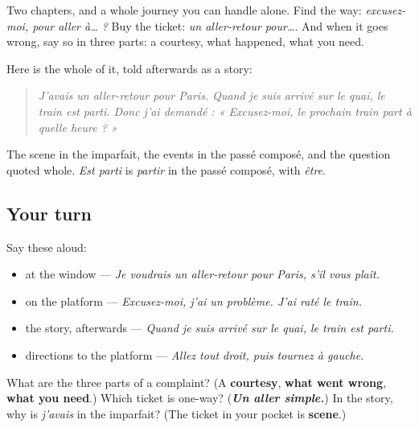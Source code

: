 \begin{grammarlens}[title={What you've built}]
Two chapters, and a whole journey you can handle alone. Find the way: \emph{excusez-moi, pour aller à… ?} Buy the ticket: \emph{un aller-retour pour…}. And when it goes wrong, say so in three parts: a courtesy, what happened, what you need.

Here is the whole of it, told afterwards as a story:

\begin{quote}
\emph{J'avais un aller-retour pour Paris. Quand je suis arrivé sur le quai, le train est parti. Donc j'ai demandé : « Excusez-moi, le prochain train part à quelle heure ? »}
\end{quote}

The scene in the imparfait, the events in the passé composé, and the question quoted whole. \emph{Est parti} is \emph{partir} in the passé composé, with \emph{être}.
\end{grammarlens}

\subsection*{Your turn}
Say these aloud:

\begin{itemize}
\raggedright
  \item at the window — \emph{Je voudrais un aller-retour pour Paris, s'il vous plaît.}
  \item on the platform — \emph{Excusez-moi, j'ai un problème. J'ai raté le train.}
  \item the story, afterwards — \emph{Quand je suis arrivé sur le quai, le train est parti.}
  \item directions to the platform — \emph{Allez tout droit, puis tournez à gauche.}
\end{itemize}

\begin{tcolorbox}[breakable,colback=teal!4,colframe=teal!35!black,title={Before you move on}]
What are the three parts of a complaint? (A \textbf{courtesy}, \textbf{what went wrong}, \textbf{what you need}.) Which ticket is one-way? (\emph{\textbf{Un aller simple.}}) In the story, why is \emph{j'avais} in the imparfait? (The ticket in your pocket is \textbf{scene}.)
\end{tcolorbox}
